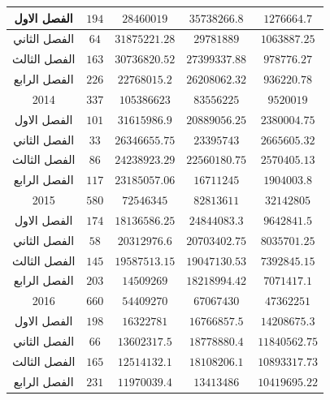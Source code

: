 \documentclass[10pt,a4paper]{report}
\begin{document}
\begin{longtable}{|c|c|c|c|c|}
الفصل الاول  & $194$                 & $28460019$       & $35738266.8$   & $1276664.7$        \\ \hline
الفصل الثاني & $64$                  & $31875221.28$    & $29781889$     & $1063887.25$       \\ \hline
الفصل الثالث & $163$                 & $30736820.52$    & $27399337.88$  & $978776.27$        \\ \hline
الفصل الرابع & $226$                 & $22768015.2$     & $26208062.32$  & $936220.78$        \\ \hline
2014         & $337$                 & $105386623$      & $83556225$     & $9520019$          \\ \hline
الفصل الاول  & $101$                 & $31615986.9$     & $20889056.25$  & $2380004.75$       \\ \hline
الفصل الثاني & $33$                  & $26346655.75$    & $23395743$     & $2665605.32$       \\ \hline
الفصل الثالث & $86$                  & $24238923.29$    & $22560180.75$  & $2570405.13$       \\ \hline
الفصل الرابع & $117$                 & $23185057.06$    & $16711245$     & $1904003.8$        \\ \hline
2015         & $580$                 & $72546345$       & $82813611$     & $32142805$         \\ \hline
الفصل الاول  & $174$                 & $18136586.25$    & $24844083.3$   & $9642841.5$        \\ \hline
الفصل الثاني & $58$                  & $20312976.6$     & $20703402.75$  & $8035701.25$       \\ \hline
الفصل الثالث & $145$                 & $19587513.15$    & $19047130.53$  & $7392845.15$       \\ \hline
الفصل الرابع & $203$                 & $14509269$       & $18218994.42$  & $7071417.1$        \\ \hline
2016         & $660$                 & $54409270$       & $67067430$     & $47362251$         \\ \hline
الفصل الاول  & $198$                 & $16322781$       & $16766857.5$   & $14208675.3$       \\ \hline
الفصل الثاني & $66$                  & $13602317.5$     & $18778880.4$   & $11840562.75$      \\ \hline
الفصل الثالث & $165$                 & $12514132.1$     & $18108206.1$   & $10893317.73$      \\ \hline
الفصل الرابع & $231$                 & $11970039.4$     & $13413486$     & $10419695.22$      \\ \hline

\end{longtable}
\end{document}
